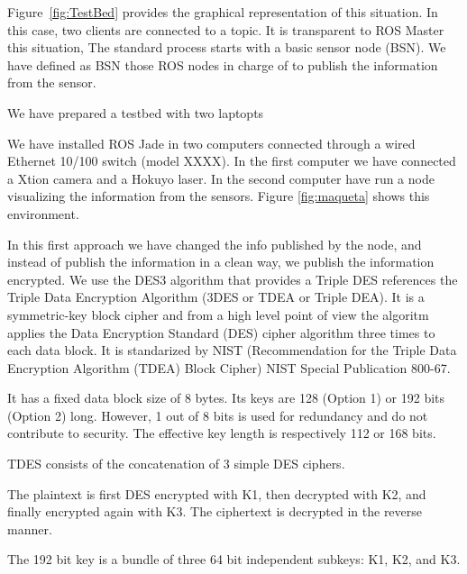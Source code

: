 \documentclass[journal,twoside]{JoPhA}
\begin{document}
Figure~\ref{fig:TestBed} provides the graphical representation of this situation. In this case, two clients are connected to a topic. It is transparent to ROS Master this situation,  
The standard process starts with a basic sensor node (BSN). We have defined as BSN those ROS nodes in charge of to publish the information from the sensor.



We have prepared a  testbed with two laptopts 


We have installed ROS Jade in two computers connected through a wired Ethernet 10/100 switch (model XXXX). In the first computer we have connected a Xtion camera and a Hokuyo laser. In the second computer have run a node visualizing the information from the sensors. Figure \ref{fig:maqueta} shows this environment.



In this first approach we have changed the info published by the node, and instead of publish the information in a clean way, we publish the information encrypted.
We use the DES3 algorithm that provides a 
Triple DES references the Triple Data Encryption Algorithm (3DES or TDEA or Triple DEA). It is a symmetric-key block cipher and from a high level point of view the algoritm applies the Data Encryption Standard (DES) cipher algorithm three times to each data block. It is standarized by NIST (Recommendation for
the Triple Data Encryption Algorithm (TDEA) Block Cipher) NIST Special Publication 800-67.

It has a fixed data block size of 8 bytes. Its keys are 128 (Option 1) or 192 bits (Option 2) long. However, 1 out of 8 bits is used for redundancy and do not contribute to security. The effective key length is respectively 112 or 168 bits.

TDES consists of the concatenation of 3 simple DES ciphers.

The plaintext is first DES encrypted with K1, then decrypted with K2, and finally encrypted again with K3. The ciphertext is decrypted in the reverse manner.

The 192 bit key is a bundle of three 64 bit independent subkeys: K1, K2, and K3.
\end{document}
